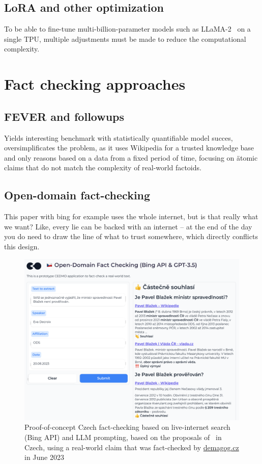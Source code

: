 
\subsection{LoRA and other optimization}
To be able to fine-tune multi-billion-parameter models such as \textsf{LLaMA-2}~\cite{llama2} on a single TPU, multiple adjustments must be made to reduce the computational complexity.~\cite{peft}
\cite{lora}

\section{Fact checking approaches}
\subsection{FEVER and followups}
Yields interesting benchmark with statistically quantifiable model succes, oversimplificates the problem, as it uses Wikipedia for a trusted knowledge base and only reasons based on a data from a fixed period of time, focusing on \"{atomic} claims that do not match the complexity of real-world factoids.
\subsection{Open-domain fact-checking}
This paper with bing for example uses the whole internet, but is that really what we want? Like, every lie can be backed with an internet -- at the end of the day you do need to draw the line of what to trust somewhere, which directly conflicts this design.


\begin{figure}
    \includegraphics[width=14cm]{fig/bing.pdf}
    \caption{Proof-of-concept Czech fact-checking based on live-internet search (Bing API) and LLM prompting, based on the proposals of~\cite{bing} in Czech, using a real-world claim that was fact-checked by \href{https://demagog.cz/vyrok/22849}{\url{demagog.cz}} in June 2023}
    \label{fig:bing}
\end{figure}


